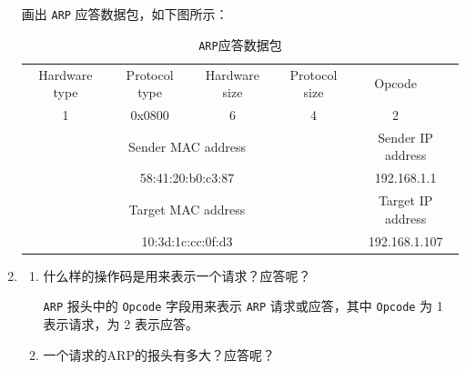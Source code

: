 \documentclass{article}
\begin{document}
\begin{enumerate}[noitemsep]
	画出 \texttt{ARP} 应答数据包，如下图所示：
	
	\begin{table}[H]
		\centering
		\begin{tabularx}{0.78\textwidth}{|*{10}{X|}}
			\hline
			\multicolumn{2}{|c|}{Hardware type}      & \multicolumn{2}{c|}{Protocol type}     & \multicolumn{1}{c|}{Hardware size} & \multicolumn{1}{c|}{Protocol size} & \multicolumn{2}{c|}{Opcode} & \multicolumn{2}{c|}{} \\
			\multicolumn{2}{|c|}{1}                  & \multicolumn{2}{c|}{0x0800}            & \multicolumn{1}{c|}{6}             & \multicolumn{1}{c|}{4}             & \multicolumn{2}{c|}{2}      & \multicolumn{2}{c|}{} \\
			\hline
			\multicolumn{6}{|c|}{Sender MAC address} & \multicolumn{4}{c|}{Sender IP address}                                                                                                                                 \\
			\multicolumn{6}{|c|}{58:41:20:b0:c3:87}  & \multicolumn{4}{c|}{192.168.1.1}                                                                                                                                       \\
			\hline
			\multicolumn{6}{|c|}{Target MAC address} & \multicolumn{4}{c|}{Target IP address}                                                                                                                                 \\
			\multicolumn{6}{|c|}{10:3d:1c:cc:0f:d3}  & \multicolumn{4}{c|}{192.168.1.107}                                                                                                                                     \\
			\hline
		\end{tabularx}
		\caption{\texttt{ARP}应答数据包}
	\end{table}
	
	\item
	\begin{enumerate}
		
		
		\item 什么样的操作码是用来表示一个请求？应答呢？
		
		\texttt{ARP} 报头中的 \texttt{Opcode} 字段用来表示 \texttt{ARP} 请求或应答，其中 \texttt{Opcode} 为 1 表示请求，为 2 表示应答。
		
		\item 一个请求的ARP的报头有多大？应答呢？
		

\end{enumerate}
\end{enumerate}
\end{document}
